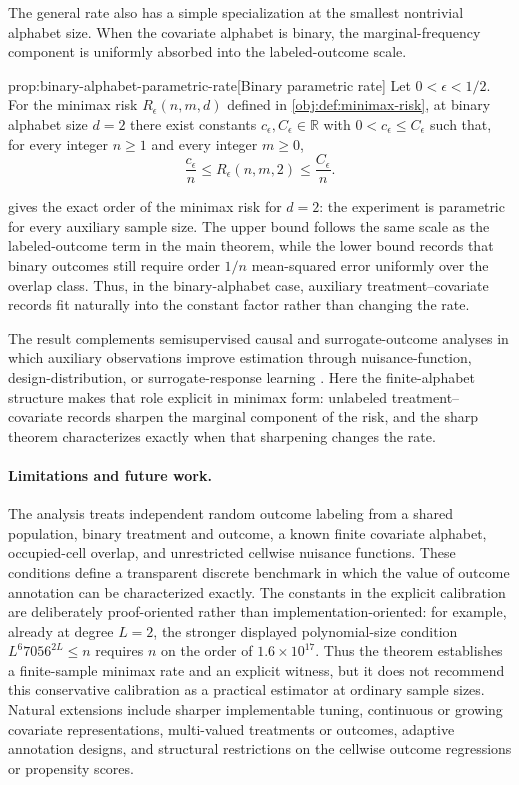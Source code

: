 \documentclass[11pt]{article}
\begin{document}
The general rate also has a simple specialization at the smallest nontrivial alphabet size. When the covariate alphabet is binary, the marginal-frequency component is uniformly absorbed into the labeled-outcome scale.

\begin{theoremv}{prop:binary-alphabet-parametric-rate}[Binary parametric rate]
Let \(0<\epsilon<1/2\). For the minimax risk \(R_\epsilon(n,m,d)\) defined in \cref{obj:def:minimax-risk}, at binary alphabet size \(d=2\) there exist constants \(c_\epsilon,C_\epsilon\in\mathbb R\) with \(0<c_\epsilon\le C_\epsilon\) such that, for every integer \(n\ge1\) and every integer \(m\ge0\),
\[
\frac{c_\epsilon}{n}\le R_\epsilon(n,m,2)\le \frac{C_\epsilon}{n}.
\]
\end{theoremv}

 gives the exact order of the minimax risk for \(d=2\): the experiment is parametric for every auxiliary sample size. The upper bound follows the same scale as the labeled-outcome term in the main theorem, while the lower bound records that binary outcomes still require order \(1/n\) mean-squared error uniformly over the overlap class. Thus, in the binary-alphabet case, auxiliary treatment--covariate records fit naturally into the constant factor rather than changing the rate.

The result complements semisupervised causal and surrogate-outcome analyses in which auxiliary observations improve estimation through nuisance-function, design-distribution, or surrogate-response learning \citep{ChengAnanthakrishnanCai2021,ChakraborttyDai2024,KallusMao2025}. Here the finite-alphabet structure makes that role explicit in minimax form: unlabeled treatment--covariate records sharpen the marginal component of the risk, and the sharp theorem characterizes exactly when that sharpening changes the rate.

\paragraph{Limitations and future work.}
The analysis treats independent random outcome labeling from a shared population, binary treatment and outcome, a known finite covariate alphabet, occupied-cell overlap, and unrestricted cellwise nuisance functions. These conditions define a transparent discrete benchmark in which the value of outcome annotation can be characterized exactly. The constants in the explicit calibration are deliberately proof-oriented rather than implementation-oriented: for example, already at degree \(L=2\), the stronger displayed polynomial-size condition \(L^6 7056^{2L}\le n\) requires \(n\) on the order of \(1.6\times10^{17}\). Thus the theorem establishes a finite-sample minimax rate and an explicit witness, but it does not recommend this conservative calibration as a practical estimator at ordinary sample sizes. Natural extensions include sharper implementable tuning, continuous or growing covariate representations, multi-valued treatments or outcomes, adaptive annotation designs, and structural restrictions on the cellwise outcome regressions or propensity scores.
\end{document}
